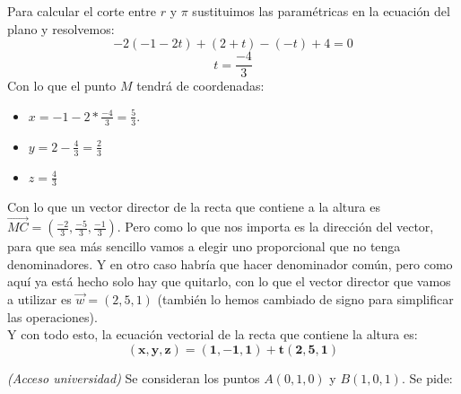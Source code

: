 \documentclass[a4paper,11pt,answers]{exam}
\begin{document}
\begin{questions}
\begin{solution}
Para calcular el corte entre $r$ y $\pi$ sustituimos las paramétricas en la ecuación del plano y resolvemos:
\[-2(-1-2t) + (2+t) - (-t) + 4 = 0\]
\[t = \frac{-4}{3}\]
Con lo que el punto $M$ tendrá de coordenadas:
\begin{itemize}
	\item $x = -1 -2 * \frac{-4}{3} = \frac{5}{3}$.
	\item $y = 2- \frac{4}{3} = \frac{2}{3}$
	\item $z = \frac{4}{3}$
\end{itemize}
Con lo que un vector director de la recta que contiene a la altura es $\overrightarrow{MC} = \left(\frac{-2}{3}, \frac{-5}{3}, \frac{-1}{3}\right)$. Pero como lo que nos importa es la dirección del vector, para que sea más sencillo vamos a elegir uno proporcional que no tenga denominadores. Y en otro caso habría que hacer denominador común, pero como aquí ya está hecho solo hay que quitarlo, con lo que el vector director que vamos a utilizar es $\vec{w} = (2,5, 1)$ (también lo hemos cambiado de signo para simplificar las operaciones).\\
Y con todo esto, la ecuación vectorial de la recta que contiene la altura es:
\[\boldsymbol{(x, y, z) = (1,-1,1) + t(2, 5, 1)}\]
\end{solution}

\question \textit{(Acceso universidad)} Se consideran los puntos $A(0,1,0)$ y $B(1,0,1)$. Se pide: 
\begin{solution}
\end{solution}
\end{questions}
\end{document}
